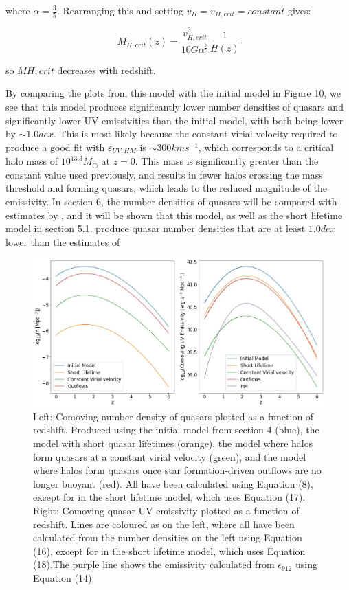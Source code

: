 \documentclass[12pt]{article}%
\begin{document}
\noindent where $\alpha=\frac{3}{5}$. Rearranging this and setting $v_H=v_{H,crit}=constant$ gives:

\begin{equation}
    M_{H,crit}(z)=\frac{v_{H,crit}^3}{10G\alpha^{\frac{3}{2}}}\frac{1}{H(z)}
\end{equation}

\noindent so $M{H,crit}$ decreases with redshift.\par

By comparing the plots from this model with the initial model in Figure 10, we see that this model produces significantly lower number densities of quasars and significantly lower UV emissivities than the initial model, with both being lower by $\sim1.0dex$. This is most likely because the constant virial velocity required to produce a good fit with $\varepsilon_{UV,HM}$ is $\sim300kms^{-1}$, which corresponds to a critical halo mass of $10^{13.3}M_\odot$ at $z=0$. This mass is significantly greater than the constant value used previously, and results in fewer halos crossing the mass threshold and forming quasars, which leads to the reduced magnitude of the emissivity. In section 6, the number densities of quasars will be compared with estimates by \cite{Hopkins}, and it will be shown that this model, as well as the short lifetime model in section 5.1, produce quasar number densities that are at least $1.0dex$ lower than the estimates of \citeauthor{Hopkins}

\onecolumngrid


\begin{figure}[H]
\centering
\includegraphics[width=\linewidth]{Plot_10.jpeg}
\caption{Left: Comoving number density of quasars plotted as a function of redshift. Produced using the initial model from section 4 (blue), the model with short quasar lifetimes (orange), the model where halos form quasars at a constant virial velocity (green), and the model where halos form quasars once star formation-driven outflows are no longer buoyant (red). All have been calculated using Equation (8), except for in the short lifetime model, which uses Equation (17). Right: Comoving quasar UV emissivity plotted as a function of redshift. Lines are coloured as on the left, where all have been calculated from the number densities on the left using Equation (16), except for in the short lifetime model, which uses Equation (18).The purple line shows the emissivity calculated from $\epsilon_{912}$ using Equation (14).}
\label{fig:10}
\end{figure}
\twocolumngrid
\end{document}
